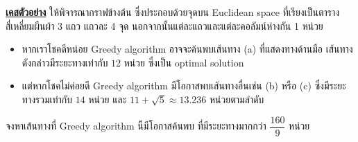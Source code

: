 \noindent
\textbf{\uline{เคสตัวอย่าง}} ให้พิจารณากราฟข้างต้น ซึ่งประกอบด้วยจุดบน Euclidean space 
ที่เรียงเป็นตารางสี่เหลี่ยมผืนผ้า 3 แถว แถวละ 4 จุด\; นอกจากนั้นแต่ละแถวและแต่ละคอลัมน์ห่างกัน 1 หน่วย

\begin{itemize}
\item หากเราโชคดีหน่อย Greedy algorithm อาจจะค้นพบเส้นทาง ({\hrsp}a{\hrsp}) 
    ที่แสดงทางด้านมือ 
    เส้นทางดังกล่าวมีระยะทางเท่ากับ $\mathrm{12}$ หน่วย ซึ่งเป็น optimal solution
\item แต่หากโชคไม่ค่อยดี Greedy algorithm มีโอกาสพบเส้นทางอื่นเช่น ({\hrsp}b{\hrsp}) หรือ ({\hrsp}c{\hrsp}) 
    ซึ่งมีระยะทางรวมเท่ากับ $\mathrm{14}$ หน่วย 
    และ $\mathrm{11} + \sqrt{\mathrm{5}}\approx\mathrm{13.236}$ หน่วยตามลำดับ
\end{itemize}

\noindent
จงหาเส้นทางที่ Greedy algorithm นี้มีโอกาสค้นพบ ที่มีระยะทางมากกว่า $\dfrac{\mathrm{160}}{\mathrm{9}}$ หน่วย

